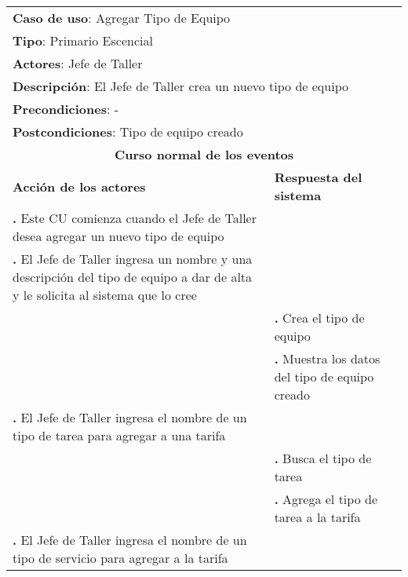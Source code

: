 \documentclass[12pt]{extarticle}
\begin{document}
    \newcommand\inc{\stepcounter{step}\textbf{\thestep. }}
    \newcommand\resetinc{\setcounter{step}{0}}
    \newcommand\raya{\noindent\rule{169mm}{0.8mm}\\}


	\begin{longtable}{ |p{8cm}|p{8cm}| }
		\hline
		\multicolumn{2}{|p{16cm}|}{\textbf{Caso de uso}: Agregar Tipo de Equipo}\\
		\multicolumn{2}{|p{16cm}|}{\textbf{Tipo}: Primario Escencial}\\
		\multicolumn{2}{|p{16cm}|}{\textbf{Actores}: Jefe de Taller}\\
		\multicolumn{2}{|p{16cm}|}{\textbf{Descripción}: El Jefe de Taller crea un nuevo tipo de equipo}\\
		\multicolumn{2}{|p{16cm}|}{\textbf{Precondiciones}: -}\\
		\multicolumn{2}{|p{16cm}|}{\textbf{Postcondiciones}: Tipo de equipo creado}\\
		\hline
		\multicolumn{2}{|c|}{\textbf{Curso normal de los eventos}}\\
		\hline
		\textbf{Acción de los actores} & \textbf{Respuesta del sistema}\\
		\hline
			\inc Este CU comienza cuando el Jefe de Taller desea agregar un nuevo tipo de equipo & \\
			\hline
            \inc El Jefe de Taller ingresa un nombre y una descripción del tipo de equipo a dar de alta y le solicita al sistema que lo cree & \\
			\hline
			& \inc Crea el tipo de equipo \\
			\hline
			& \inc Muestra los datos del tipo de equipo creado\\
			\hline
            

			\inc El Jefe de Taller ingresa el nombre de un tipo de tarea para agregar a una tarifa & \\
			\hline
			& \inc Busca el tipo de tarea \\
			\hline
            & \inc Agrega el tipo de tarea a la tarifa \\
			\hline
            \inc El Jefe de Taller ingresa el nombre de un tipo de servicio para agregar a la tarifa&\\
			\hline



\end{longtable}
\end{document}
